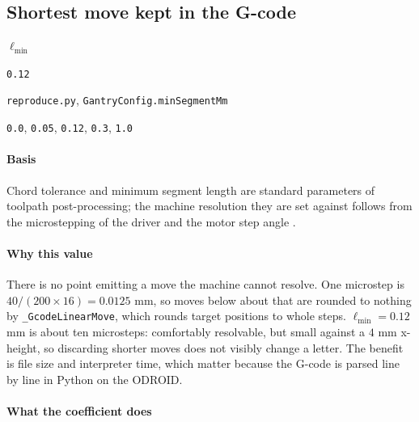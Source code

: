 \subsection{Shortest move kept in the G-code}

\label{coef:min-segment-mm}

\begin{description}[leftmargin=5.2em,style=sameline]

\item[Symbol] $\ell_{\min}$

\item[Value] \texttt{0.12}

\item[Source] \texttt{reproduce.py}, \texttt{GantryConfig.minSegmentMm}

\item[Swept] \texttt{0.0}, \texttt{0.05}, \texttt{0.12}, \texttt{0.3}, \texttt{1.0}

\end{description}

\paragraph{Basis}

Chord tolerance and minimum segment length are standard parameters of toolpath post-processing; the machine resolution they are set against follows from the microstepping of the driver \cite{a4988ds} and the motor step angle \cite{stepperds}.

\paragraph{Why this value}

There is no point emitting a move the machine cannot resolve. One microstep is $40/(200 \times 16) = 0.0125$ mm, so moves below about that are rounded to nothing by \texttt{\_GcodeLinearMove}, which rounds target positions to whole steps. $\ell_{\min} = 0.12$ mm is about ten microsteps: comfortably resolvable, but small against a $4$ mm x-height, so discarding shorter moves does not visibly change a letter. The benefit is file size and interpreter time, which matter because the G-code is parsed line by line in Python on the ODROID.

\paragraph{What the coefficient does}

